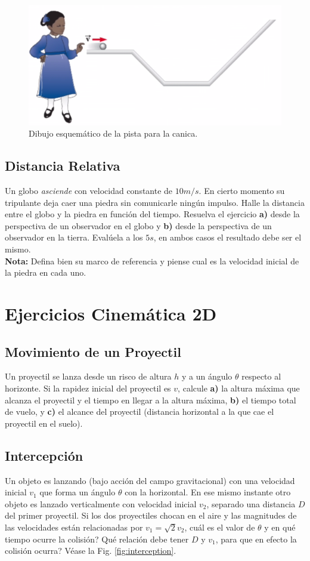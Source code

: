 \documentclass{replab}
\begin{document}
\begin{figure}[htbp]
	\centering
	\includegraphics[width=.4\columnwidth]{imagenes/pista2.png}
	\caption{Dibujo esquemático de la pista para la canica.}
	\label{fig:pista2}
\end{figure}

\subsection{Distancia Relativa}
	Un globo \textit{asciende} con velocidad constante de $10m/s$. En cierto momento su tripulante deja caer una piedra sin comunicarle ningún impulso. Halle la distancia entre el globo y la piedra en función del tiempo. Resuelva el ejercicio \textbf{a)} desde la perspectiva de un observador en el globo y \textbf{b)} desde la perspectiva de un observador en la tierra. Evalúela a los $5s$, en ambos casos el resultado debe ser el mismo.\\ 

	\textbf{Nota:} Defina bien su marco de referencia y piense cual es la velocidad inicial de la piedra en cada uno.

\section{Ejercicios Cinemática 2D}

\subsection{Movimiento de un Proyectil}
Un proyectil se lanza desde un risco de altura $h$ y a un ángulo $\theta$ respecto al horizonte. Si la rapidez inicial del proyectil es $v$, calcule \textbf{a)} la altura máxima que alcanza el proyectil y el tiempo en llegar a la altura máxima, \textbf{b)} el tiempo total de vuelo, y \textbf{c)} el alcance del proyectil (distancia horizontal a la que cae el proyectil en el suelo).

\subsection{Intercepción}
Un objeto es lanzando (bajo acción del campo gravitacional) con una velocidad inicial $v_1$ que forma un ángulo $\theta$ con la horizontal. En ese mismo instante otro objeto es lanzado verticalmente con velocidad inicial $v_2$, separado una distancia $D$ del primer proyectil. Si los dos proyectiles chocan en el aire y las magnitudes de las velocidades están relacionadas por $v_1 = \sqrt{2}v_2$, \textquestiondown cuál es el valor de $\theta$ y en qué tiempo ocurre la colisión? \textquestiondown Qué relación debe tener $D$ y $v_1$, para que en efecto la colisión ocurra? Véase la Fig. \ref{fig:interception}.
\end{document}
